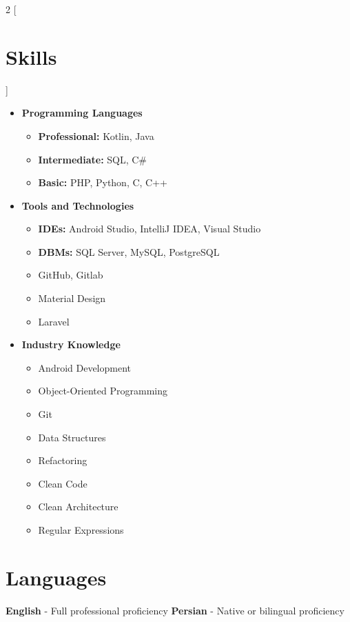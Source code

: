 \begin{multicols}{2}
[\section*{\LARGE{Skills}}]
    \begin{itemize}
        \item \textbf{Programming Languages}
        \begin{itemize}
            \item \textbf{Professional:} Kotlin, Java
            \item \textbf{Intermediate:} SQL, C\#
            \item \textbf{Basic:} PHP, Python, C, C++
        \end{itemize}
        \item \textbf{Tools and Technologies}
        \begin{itemize}
            \item \textbf{IDEs:} Android Studio, IntelliJ IDEA, Visual Studio
            \item \textbf{DBMs:} SQL Server, MySQL, PostgreSQL
            \item GitHub, Gitlab
            \item Material Design
            \item Laravel
        \end{itemize}
        \item \textbf{Industry Knowledge}
        \begin{itemize}
            \item Android Development
            \item Object-Oriented Programming
            \item Git
            \item Data Structures
            \item Refactoring
            \item Clean Code
            \item Clean Architecture
            \item Regular Expressions
        \end{itemize}
    \end{itemize}
\end{multicols}

\section*{Languages}
\textbf{English} - Full professional proficiency \hfill \textbf{Persian} - Native or bilingual proficiency